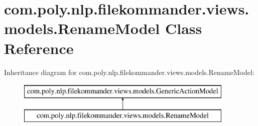 \hypertarget{classcom_1_1poly_1_1nlp_1_1filekommander_1_1views_1_1models_1_1_rename_model}{\section{com.\-poly.\-nlp.\-filekommander.\-views.\-models.\-Rename\-Model Class Reference}
\label{classcom_1_1poly_1_1nlp_1_1filekommander_1_1views_1_1models_1_1_rename_model}
}
Inheritance diagram for com.\-poly.\-nlp.\-filekommander.\-views.\-models.\-Rename\-Model\-:\begin{figure}[H]
\begin{center}
\leavevmode
\includegraphics[height=2.000000cm]{classcom_1_1poly_1_1nlp_1_1filekommander_1_1views_1_1models_1_1_rename_model}
\end{center}
\end{figure}
